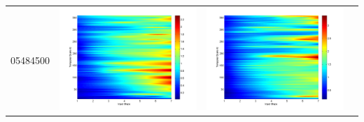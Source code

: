 \documentclass[11pt]{article}
\begin{document}
\begin{table}[H]
{\begin{tabular}{c  c   c   c  }
05484500&\begin{minipage}{.3\textwidth}\includegraphics[width=\linewidth]{resultgraph/05484500p.png}\end{minipage}
&\begin{minipage}{.3\textwidth}\includegraphics[width=\linewidth]{resultgraph/05484500pep.png}\end{minipage}

\end{tabular}}
\end{table}
\end{document}
